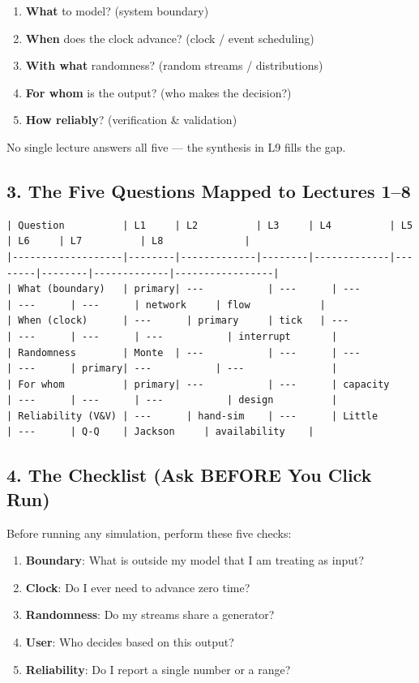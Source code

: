 \documentclass[11pt]{article}
\begin{document}
\begin{enumerate}[leftmargin=*]
\item \textbf{What} to model? (system boundary)  
\item \textbf{When} does the clock advance? (clock / event scheduling)  
\item \textbf{With what} randomness? (random streams / distributions)  
\item \textbf{For whom} is the output? (who makes the decision?)  
\item \textbf{How reliably}? (verification \& validation)
\end{enumerate}

No single lecture answers all five --- the synthesis in L9 fills the gap.

\subsection*{3. The Five Questions Mapped to Lectures 1--8}

\begin{verbatim}
| Question          | L1     | L2          | L3     | L4          | L5     | L6     | L7          | L8              |
|-------------------|--------|-------------|--------|-------------|--------|--------|-------------|-----------------|
| What (boundary)   | primary| ---           | ---      | ---           | ---      | ---      | network     | flow            |
| When (clock)      | ---      | primary     | tick   | ---           | ---      | ---      | ---           | interrupt       |
| Randomness        | Monte  | ---           | ---      | ---           | ---      | primary| ---           | ---               |
| For whom          | primary| ---           | ---      | capacity    | ---      | ---      | ---           | design          |
| Reliability (V&V) | ---      | hand-sim    | ---      | Little      | ---      | Q-Q    | Jackson     | availability    |
\end{verbatim}

\subsection*{4. The Checklist (Ask BEFORE You Click Run)}
Before running any simulation, perform these five checks:

\begin{enumerate}[leftmargin=*]
\item \textbf{Boundary}: What is outside my model that I am treating as input?  
\item \textbf{Clock}: Do I ever need to advance zero time?  
\item \textbf{Randomness}: Do my streams share a generator?  
\item \textbf{User}: Who decides based on this output?  
\item \textbf{Reliability}: Do I report a single number or a range?
\end{enumerate}
\end{document}
